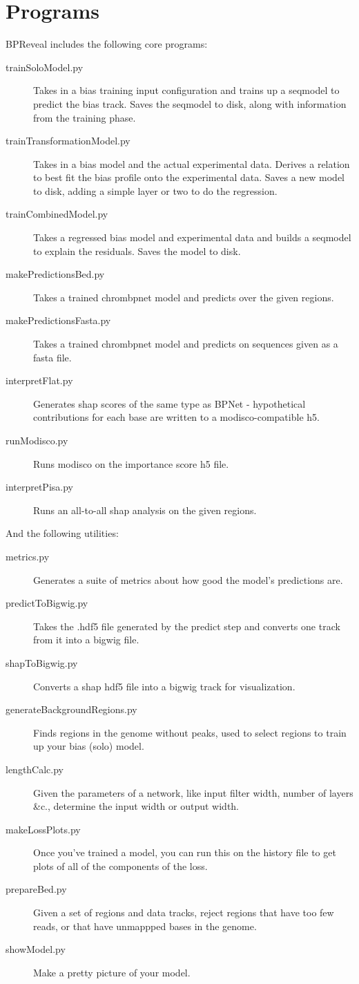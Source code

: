 \documentclass{article}
\begin{document}
\section{Programs}
BPReveal includes the following core programs:
\begin{description}
    \item [trainSoloModel.py] Takes in a bias training input configuration and trains up a seqmodel to predict the bias track. Saves the seqmodel to disk, along with information from the training phase. 
    \item [trainTransformationModel.py] Takes in a bias model and the actual experimental data. Derives a relation to best fit the bias profile onto the experimental data. Saves a new model to disk, adding a simple layer or two to do the regression. 
    \item [trainCombinedModel.py] Takes a regressed bias model and experimental data and builds a seqmodel to explain the residuals. Saves the model to disk. 
    \item [makePredictionsBed.py] Takes a trained chrombpnet model and predicts over the given regions. 
    \item [makePredictionsFasta.py] Takes a trained chrombpnet model and predicts on sequences given as a fasta file.
    \item [interpretFlat.py] Generates shap scores of the same type as BPNet - hypothetical contributions for each base are written to a modisco-compatible h5. 
    \item [runModisco.py] Runs modisco on the importance score h5 file.
    \item [interpretPisa.py] Runs an all-to-all shap analysis on the given regions. 
\end{description}

And the following utilities:
\begin{description}
    \item [metrics.py] Generates a suite of metrics about how good the model's predictions are. 
    \item [predictToBigwig.py] Takes the .hdf5 file generated by the predict step and converts one track from it into a bigwig file.
    \item [shapToBigwig.py] Converts a shap hdf5 file into a bigwig track for visualization. 
    \item [generateBackgroundRegions.py] Finds regions in the genome without peaks, used to select regions to train up your bias (solo) model.
    \item [lengthCalc.py] Given the parameters of a network, like input filter width, number of layers &c., determine the input width or output width.
    \item [makeLossPlots.py] Once you've trained a model, you can run this on the history file to get plots of all of the components of the loss. 
    \item [prepareBed.py] Given a set of regions and data tracks, reject regions that have too few reads, or that have unmappped bases in the genome.
    \item [showModel.py] Make a pretty picture of your model.
\end{description}
\end{document}
